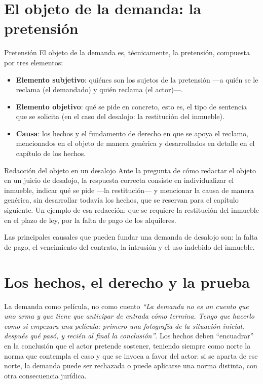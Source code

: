 \documentclass[12pt,oneside]{book}
\begin{document}
\section{El objeto de la demanda: la pretensión}

\begin{definition}{Pretensión}
El objeto de la demanda es, técnicamente, la pretensión, compuesta por tres elementos:
\begin{itemize}
    \item \textbf{Elemento subjetivo}: quiénes son los sujetos de la pretensión —a quién se le reclama (el demandado) y quién reclama (el actor)—.
    \item \textbf{Elemento objetivo}: qué se pide en concreto, esto es, el tipo de sentencia que se solicita (en el caso del desalojo: la restitución del inmueble).
    \item \textbf{Causa}: los hechos y el fundamento de derecho en que se apoya el reclamo, mencionados en el objeto de manera genérica y desarrollados en detalle en el capítulo de los hechos.
\end{itemize}
\end{definition}

\begin{example}{Redacción del objeto en un desalojo}
Ante la pregunta de cómo redactar el objeto en un juicio de desalojo, la respuesta correcta consiste en individualizar el inmueble, indicar qué se pide —la restitución— y mencionar la causa de manera genérica, sin desarrollar todavía los hechos, que se reservan para el capítulo siguiente. Un ejemplo de esa redacción: que se requiere la restitución del inmueble en el plazo de ley, por la falta de pago de los alquileres.
\end{example}

Las principales causales que pueden fundar una demanda de desalojo son: la falta de pago, el vencimiento del contrato, la intrusión y el uso indebido del inmueble.

\section{Los hechos, el derecho y la prueba}

\begin{example}{La demanda como película, no como cuento}
\textit{``La demanda no es un cuento que uno arma y que tiene que anticipar de entrada cómo termina. Tengo que hacerlo como si empezara una película: primero una fotografía de la situación inicial, después qué pasó, y recién al final la conclusión''}. Los hechos deben ``encuadrar'' en la conclusión que el actor pretende sostener, teniendo siempre como norte la norma que contempla el caso y que se invoca a favor del actor: si se aparta de ese norte, la demanda puede ser rechazada o puede aplicarse una norma distinta, con otra consecuencia jurídica.
\end{example}
\end{document}
